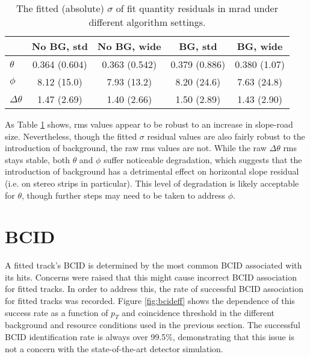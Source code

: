 \begin{table}[htbp]
\begin{center}
\begin{tabular}{|l|c|c|c|c|}
\hline
               & No BG, std    & No BG, wide   & BG, std       & BG, wide\\
\hline
$\theta$       & 0.364 (0.604) & 0.363 (0.542) & 0.379 (0.886) & 0.380 (1.07)  \\
$\phi$         & 8.12 (15.0)   & 7.93 (13.2)   & 8.20 (24.6)   & 7.63 (24.8)\\
$\Delta\theta$ & 1.47 (2.69)   & 1.40 (2.66)   & 1.50 (2.89)   & 1.43 (2.90)\\
\hline
\end{tabular}
\caption{\label{tab:resbgfat} The fitted (absolute) $\sigma$ of fit quantity residuals in mrad under different algorithm settings.}
\end{center}
\end{table}

As Table \ref{tab:resbgfat} shows, rms values appear to be robust to an increase in slope-road size.  Nevertheless, though the fitted $\sigma$ residual values are also fairly robust to the introduction of background, the raw rms values are not.  While the raw $\Delta\theta$ rms stays stable, both $\theta$ and $\phi$ suffer noticeable degradation, which suggests that the introduction of background has a detrimental effect on horizontal slope residual (i.e. on stereo strips in particular).  This level of degradation is likely acceptable for $\theta$, though further steps may need to be taken to address $\phi$.  %

\section{BCID}
A fitted track's BCID is determined by the most common BCID associated with its hits.  Concerns were raised that this might cause incorrect BCID association for fitted tracks.  In order to address this, the rate of successful BCID association for fitted tracks was recorded.  Figure \ref{fig:bcideff} shows the dependence of this success rate as a function of $p_T$ and coincidence threshold in the different background and resource conditions used in the previous section.  The successful BCID identification rate is always over 99.5\%, demonstrating that this issue is not a concern with the state-of-the-art detector simulation.

